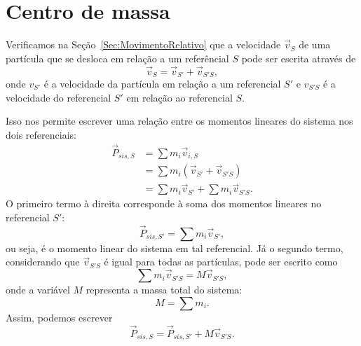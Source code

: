 \section{Centro de massa}
\label{Sec:CentroDeMassa}

Verificamos na Seção~\ref{Sec:MovimentoRelativo} que a velocidade $\vec{v}_S$ de uma partícula que se desloca em relação a um referêncial $S$ pode ser escrita através de
\begin{equation}
     \vec{v}_S = \vec{v}_{S'} + \vec{v}_{S'S},
\end{equation}
%
onde $v_{S'}$ é a velocidade da partícula em relação a um referencial $S'$ e $v_{S'S}$ é a velocidade do referencial $S'$ em relação ao referencial $S$.

Isso nos permite escrever uma relação entre os momentos lineares do sistema nos dois referenciais:
\begin{align}
    \vec{P}_{sis, S} &= \sum m_i \vec{v}_{i,S} \\
    &= \sum m_i (\vec{v}_{S'} + \vec{v}_{S'S}) \\
    &= \sum m_i \vec{v}_{S'} + \sum m_i \vec{v}_{S'S}.
\end{align}
%
O primeiro termo à direita corresponde à soma dos momentos lineares no referencial $S'$:
\begin{equation}
    \vec{P}_{sis, S'} = \sum m_i \vec{v}_{S'},
\end{equation}
%
ou seja, é o momento linear do sistema em tal referencial. Já o segundo termo, considerando que $\vec{v}_{S'S}$ é igual para todas as partículas, pode ser escrito como
\begin{equation}
    \sum m_i \vec{v}_{S'S} = M \vec{v}_{S'S},
\end{equation}
%
onde a variável $M$ representa a massa total do sistema:
\begin{equation}
    M = \sum m_i.
\end{equation}
%
Assim, podemos escrever
\begin{equation}
    \vec{P}_{sis, S} = \vec{P}_{sis, S'} + M \vec{v}_{S'S}.
\end{equation}

